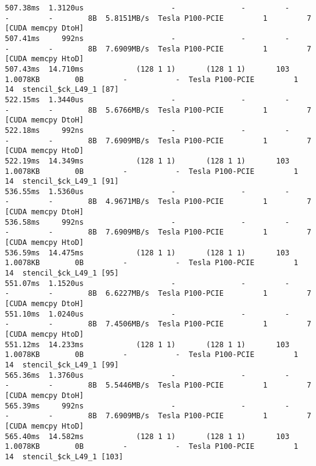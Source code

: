 \documentclass{beamer}
\begin{document}
\begin{frame}[fragile]
\begin{verbatim}
507.38ms  1.3120us                    -               -         -         -         -        8B  5.8151MB/s  Tesla P100-PCIE         1         7  [CUDA memcpy DtoH]
507.41ms     992ns                    -               -         -         -         -        8B  7.6909MB/s  Tesla P100-PCIE         1         7  [CUDA memcpy HtoD]
507.43ms  14.710ms            (128 1 1)       (128 1 1)       103  1.0078KB        0B         -           -  Tesla P100-PCIE         1        14  stencil_$ck_L49_1 [87] 
522.15ms  1.3440us                    -               -         -         -         -        8B  5.6766MB/s  Tesla P100-PCIE         1         7  [CUDA memcpy DtoH]
522.18ms     992ns                    -               -         -         -         -        8B  7.6909MB/s  Tesla P100-PCIE         1         7  [CUDA memcpy HtoD]        
522.19ms  14.349ms            (128 1 1)       (128 1 1)       103  1.0078KB        0B         -           -  Tesla P100-PCIE         1        14  stencil_$ck_L49_1 [91] 
536.55ms  1.5360us                    -               -         -         -         -        8B  4.9671MB/s  Tesla P100-PCIE         1         7  [CUDA memcpy DtoH]
536.58ms     992ns                    -               -         -         -         -        8B  7.6909MB/s  Tesla P100-PCIE         1         7  [CUDA memcpy HtoD]
536.59ms  14.475ms            (128 1 1)       (128 1 1)       103  1.0078KB        0B         -           -  Tesla P100-PCIE         1        14  stencil_$ck_L49_1 [95]
551.07ms  1.1520us                    -               -         -         -         -        8B  6.6227MB/s  Tesla P100-PCIE         1         7  [CUDA memcpy DtoH]
551.10ms  1.0240us                    -               -         -         -         -        8B  7.4506MB/s  Tesla P100-PCIE         1         7  [CUDA memcpy HtoD]
551.12ms  14.233ms            (128 1 1)       (128 1 1)       103  1.0078KB        0B         -           -  Tesla P100-PCIE         1        14  stencil_$ck_L49_1 [99]
565.36ms  1.3760us                    -               -         -         -         -        8B  5.5446MB/s  Tesla P100-PCIE         1         7  [CUDA memcpy DtoH]
565.39ms     992ns                    -               -         -         -         -        8B  7.6909MB/s  Tesla P100-PCIE         1         7  [CUDA memcpy HtoD]
565.40ms  14.582ms            (128 1 1)       (128 1 1)       103  1.0078KB        0B         -           -  Tesla P100-PCIE         1        14  stencil_$ck_L49_1 [103]


\end{verbatim}
\end{frame}
\end{document}
